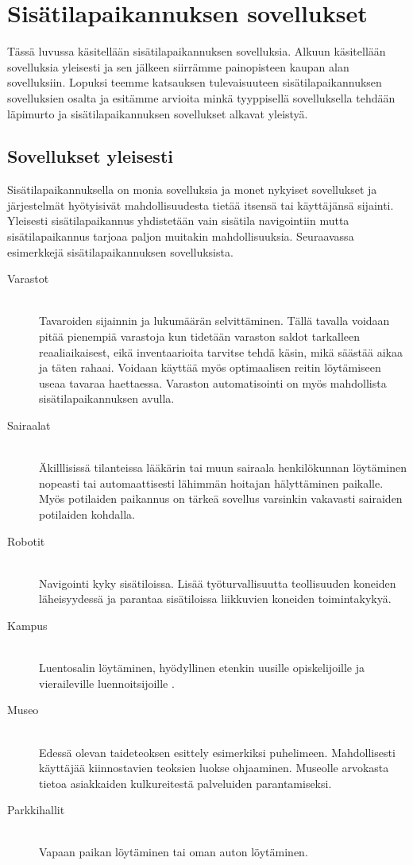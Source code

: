 \section{Sisätilapaikannuksen sovellukset}
Tässä luvussa käsitellään sisätilapaikannuksen sovelluksia. Alkuun käsitellään sovelluksia yleisesti ja sen jälkeen siirrämme painopisteen kaupan alan sovelluksiin. Lopuksi teemme katsauksen tulevaisuuteen sisätilapaikannuksen sovelluksien osalta ja esitämme arvioita minkä tyyppisellä sovelluksella tehdään läpimurto ja sisätilapaikannuksen sovellukset alkavat yleistyä.

\subsection{Sovellukset yleisesti}
Sisätilapaikannuksella on monia sovelluksia ja monet nykyiset sovellukset ja järjestelmät hyötyisivät mahdollisuudesta tietää itsensä tai käyttäjänsä sijainti. Yleisesti sisätilapaikannus yhdistetään vain sisätila navigointiin mutta sisätilapaikannus tarjoaa paljon muitakin mahdollisuuksia. Seuraavassa esimerkkejä sisätilapaikannuksen sovelluksista. 

\begin{description}
\item[Varastot]\hfill \\
Tavaroiden sijainnin ja lukumäärän selvittäminen. Tällä tavalla voidaan pitää pienempiä varastoja kun tidetään varaston saldot tarkalleen reaaliaikaisest, eikä inventaarioita tarvitse tehdä käsin, mikä säästää aikaa ja täten rahaai. Voidaan käyttää myös optimaalisen reitin löytämiseen useaa tavaraa haettaessa. Varaston automatisointi on myös mahdollista sisätilapaikannuksen avulla.
\item[Sairaalat]\hfill \\
Äkilllisissä tilanteissa lääkärin tai muun sairaala henkilökunnan löytäminen nopeasti\cite{ibeacon} tai automaattisesti lähimmän hoitajan hälyttäminen paikalle. Myös potilaiden paikannus on tärkeä sovellus varsinkin vakavasti sairaiden potilaiden kohdalla.
\item[Robotit]\hfill \\
Navigointi kyky sisätiloissa. Lisää työturvallisuutta teollisuuden koneiden läheisyydessä ja parantaa sisätiloissa liikkuvien koneiden toimintakykyä.\cite{lips}
\item[Kampus]\hfill \\
Luentosalin löytäminen, hyödyllinen etenkin uusille opiskelijoille ja vieraileville luennoitsijoille \cite{campus}.
\item[Museo]\hfill \\
Edessä olevan taideteoksen esittely esimerkiksi puhelimeen. Mahdollisesti käyttäjää kiinnostavien teoksien luokse ohjaaminen. Museolle arvokasta tietoa asiakkaiden kulkureitestä palveluiden parantamiseksi.
\item[Parkkihallit]\hfill \\
Vapaan paikan löytäminen tai oman auton löytäminen\cite{lips}.
\end{description}

